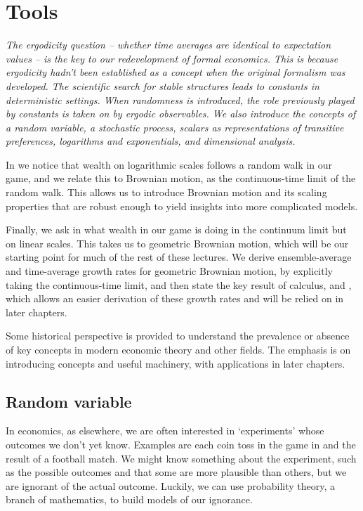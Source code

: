 \chapter{Tools}

{\it
The ergodicity question  -- whether time averages are identical to expectation values -- is the key to our redevelopment of formal economics. This is because ergodicity hadn't been established as a concept when the original formalism was developed. The scientific search for stable structures leads to constants in deterministic settings. When randomness is introduced, the role previously played by constants is taken on by ergodic observables. We also introduce the concepts of a random variable, a stochastic process, scalars as representations of transitive preferences, logarithms and exponentials, and dimensional analysis.

In  we notice that wealth on logarithmic scales follows a random walk in our game, and we relate this to Brownian motion, as the continuous-time limit of the random walk. This allows us to introduce Brownian motion and its scaling properties that are robust enough to yield insights into more complicated models.

Finally, we ask in  what wealth in our game is doing in the continuum limit but on linear scales. This takes us to geometric Brownian motion, which will be our starting point for much of the rest of these lectures. We derive ensemble-average and time-average growth rates for geometric Brownian motion, by explicitly taking the continuous-time limit, and then state the key result of \Ito calculus,  and , which allows an easier derivation of these growth rates and will be relied on in later chapters.

Some historical perspective is provided to understand the prevalence or absence of key concepts in modern economic theory and other fields. The emphasis is on introducing concepts and useful machinery, with applications in later chapters.
}
\newpage

\section{Random variable}
In economics, as elsewhere, we are often interested in `experiments' whose outcomes we don't yet know. Examples are each coin toss in the game in  and the result of a football match. We might know something about the experiment, such as the possible outcomes and that some are more plausible than others, but we are ignorant of the actual outcome. Luckily, we can use probability theory, a branch of mathematics, to build models of our ignorance.

